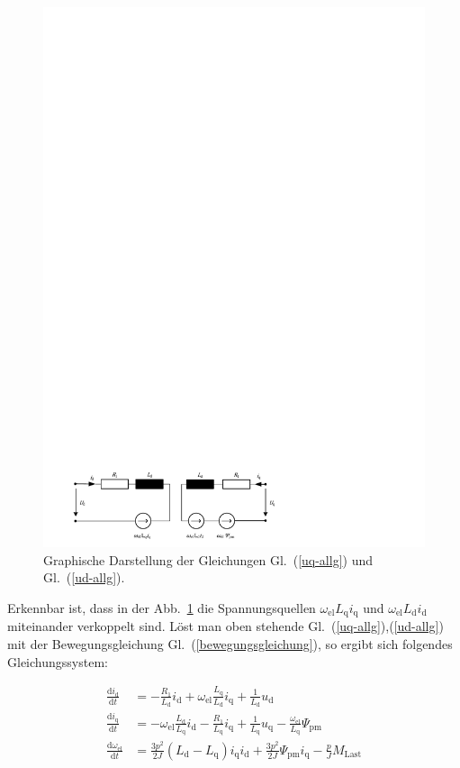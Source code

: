 \documentclass[conference,twocolumn]{IEEEtran}
\newcommand{\x}[1]{\mathrm{#1}}
\begin{document}
\begin{figure}[!h]
\centering
\includegraphics[width=\columnwidth]{img/spannungsgleichungen}
\caption{Graphische Darstellung der Gleichungen Gl.~(\ref{uq-allg}) und Gl.~(\ref{ud-allg}).}
\label{fig:spannungsgleichungen}
\end{figure}

Erkennbar ist, dass in der Abb.~\ref{fig:spannungsgleichungen} die Spannungsquellen $\omega_\x{el} L_\x{q} i_\x{q}$ und $\omega_\x{el} L_\x{d} i_\x{d}$ miteinander verkoppelt sind.
Löst man oben stehende Gl.~(\ref{uq-allg}),(\ref{ud-allg}) mit der Bewegungsgleichung Gl.~(\ref{bewegungsgleichung}), so ergibt sich folgendes Gleichungssystem:

\begin{align}
\frac{\x{d}i_\x{d}}{\x{d}t} &= -\frac{R_\x{1}}{L_\x{d}}i_\x{d}+\omega_\x{el}\frac{L_\x{q}}{L_\x{d}}i_\x{q}+\frac{1}{L_\x{d}}u_\x{d} \\
\frac{\x{d}i_\x{q}}{\x{d}t} &= -\omega_\x{el}\frac{L_\x{d}}{L_\x{q}}i_\x{d} - \frac{R_\x{1}}{L_\x{q}}i_\x{q} + \frac{1}{L_\x{q}}u_\x{q} - \frac{\omega_\x{el}}{L_\x{q}}\Psi_\x{pm} \\
\frac{\x{d}\omega_\x{el}}{\x{d}t} &= \frac{3p^2}{2J}(L_\x{d} - L_\x{q})i_\x{q} i_\x{d} + \frac{3p^2}{2J} \Psi_\x{pm} i_\x{q} - \frac{p}{J} M_\x{Last}
\end{align}
\end{document}
